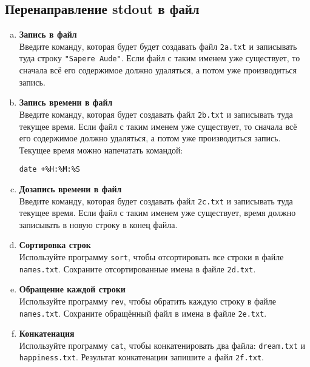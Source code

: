 \documentclass{article}
\begin{document}
\subsection{Перенаправление stdout в файл}
\begin{enumerate}[a.]
\item \textbf{Запись в файл}\\
Введите команду, которая будет будет создавать файл \texttt{2a.txt} и записывать туда строку \texttt{"Sapere Aude"}. Если файл с таким именем уже существует, то сначала всё его содержимое должно удаляться, а потом уже производиться запись.

\item \textbf{Запись времени в файл}\\
Введите команду, которая будет создавать файл \texttt{2b.txt} и записывать туда текущее время. Если файл с таким именем уже существует, то сначала всё его содержимое должно удаляться, а потом уже производиться запись. Текущее время можно напечатать командой:
\begin{lstlisting}
date +%H:%M:%S
\end{lstlisting}

\item \textbf{Дозапись времени в файл}\\
Введите команду, которая будет создавать файл \texttt{2c.txt} и записывать туда текущее время. Если файл с таким именем уже существует, время должно записывать в новую строку в конец файла.

\item \textbf{Сортировка строк}\\
Используйте программу \texttt{sort}, чтобы отсортировать все строки в файле \texttt{names.txt}. Сохраните отсортированные имена в файле \texttt{2d.txt}.

\item \textbf{Обращение каждой строки}\\
Используйте программу \texttt{rev}, чтобы обратить каждую строку в файле \texttt{names.txt}. Сохраните обращённый файл в имена в файле \texttt{2e.txt}.

\item \textbf{Конкатенация}\\
Используйте программу \texttt{cat}, чтобы конкатенировать два файла: \texttt{dream.txt} и \texttt{happiness.txt}. Результат конкатенации запишите а файл \texttt{2f.txt}.


\end{enumerate}
\end{document}
